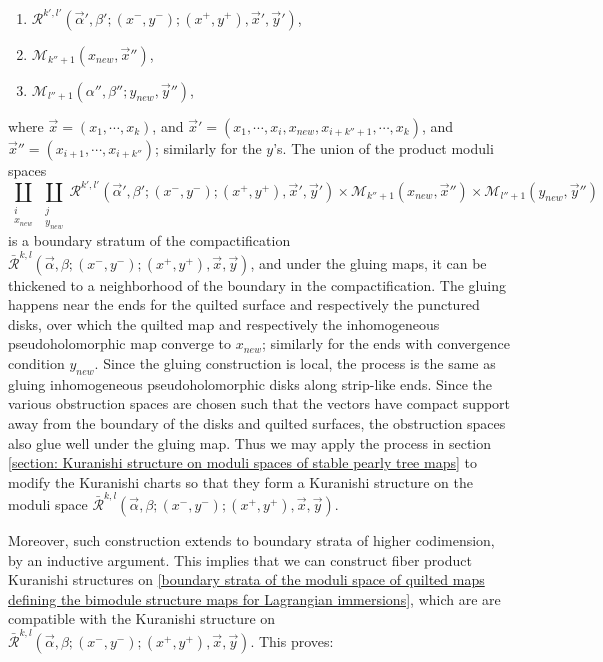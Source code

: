 \documentclass{amsart}
\numberwithin{equation}{section}
\numberwithin{figure}{section}
\begin{document}
\begin{enumerate}[label=(\roman*)]

\item $\mathcal{R}^{k', l'}(\vec{\alpha}', \beta'; (x^{-}, y^{-}); (x^{+}, y^{+}), \vec{x}', \vec{y}')$,

\item $\mathcal{M}_{k''+1}(x_{new}, \vec{x}'')$,

\item $\mathcal{M}_{l''+1}(\alpha'', \beta''; y_{new}, \vec{y}'')$,

\end{enumerate}
where $\vec{x} = (x_{1}, \cdots, x_{k})$, and $\vec{x}' = (x_{1}, \cdots, x_{i}, x_{new}, x_{i+k''+1}, \cdots, x_{k})$, and $\vec{x}'' = (x_{i+1}, \cdots, x_{i+k''})$; similarly for the $y$'s. The union of the product moduli spaces
\begin{equation}
\coprod_{\substack{i\\x_{new}}}
\coprod_{\substack{j\\y_{new}}}
\mathcal{R}^{k', l'}(\vec{\alpha}', \beta'; (x^{-}, y^{-}); (x^{+}, y^{+}), \vec{x}', \vec{y}') \times \mathcal{M}_{k''+1}(x_{new}, \vec{x}'') \times \mathcal{M}_{l''+1}(y_{new}, \vec{y}'')
\end{equation}
is a boundary stratum of the compactification $\bar{\mathcal{R}}^{k, l}(\vec{\alpha}, \beta; (x^{-}, y^{-}); (x^{+}, y^{+}), \vec{x}, \vec{y})$, and under the gluing maps, it can be thickened to a neighborhood of the boundary in the compactification. The gluing happens near the ends for the quilted surface and respectively the punctured disks, over which the quilted map and respectively the inhomogeneous pseudoholomorphic map converge to $x_{new}$; similarly for the ends with convergence condition $y_{new}$. Since the gluing construction is local, the process is the same as gluing inhomogeneous pseudoholomorphic disks along strip-like ends. Since the various obstruction spaces are chosen such that the vectors have compact support away from the boundary of the disks and quilted surfaces, the obstruction spaces also glue well under the gluing map. Thus we may apply the process in section \ref{section: Kuranishi structure on moduli spaces of stable pearly tree maps} to modify the Kuranishi charts so that they form a Kuranishi structure on the moduli space $\bar{\mathcal{R}}^{k, l}(\vec{\alpha}, \beta; (x^{-}, y^{-}); (x^{+}, y^{+}), \vec{x}, \vec{y})$. \par
	Moreover, such construction extends to boundary strata of higher codimension, by an inductive argument. This implies that we can  construct fiber product Kuranishi structures on \eqref{boundary strata of the moduli space of quilted maps defining the bimodule structure maps for Lagrangian immersions}, which are are compatible with the Kuranishi structure on $\bar{\mathcal{R}}^{k, l}(\vec{\alpha}, \beta; (x^{-}, y^{-}); (x^{+}, y^{+}), \vec{x}, \vec{y})$. This proves: \par
\end{document}
